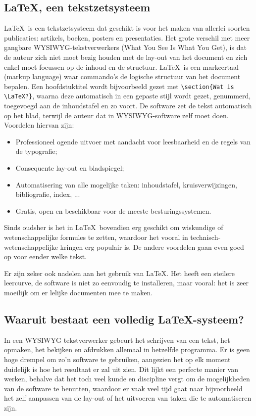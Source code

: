 \documentclass[kulak]{kulakarticle} %
\begin{document}
\subsection{\LaTeX, een tekstzetsysteem}
\LaTeX\ is een tekstzetsysteem dat geschikt is voor het maken van allerlei soorten publicaties: artikels, boeken, posters en presentaties. Het grote verschil met meer gangbare WYSIWYG-tekstverwerkers (What You See Is What You Get), is dat de auteur zich niet moet bezig houden met de lay-out van het document en zich enkel moet focussen op de inhoud en de structuur. \LaTeX\ is een markeertaal (markup language) waar commando's de logische structuur van het document bepalen. Een hoofdstuktitel wordt bijvoorbeeld gezet met \verb+\section{Wat is \LaTeX?}+, waarna deze automatisch in een gepaste stijl wordt gezet, genummerd, toegevoegd aan de inhoudstafel en zo voort. De software zet de tekst automatisch op het blad, terwijl de auteur dat in WYSIWYG-software zelf moet doen. Voordelen hiervan zijn:
\begin{itemize}
	\item Professioneel ogende uitvoer met aandacht voor leesbaarheid en de regels van de typografie;
	\item Consequente lay-out en bladspiegel;
	\item Automatisering van alle mogelijke taken: inhoudstafel, kruisverwijzingen, bibliografie, index, ...
	\item Gratis, open en beschikbaar voor de meeste besturingssystemen.
\end{itemize}
Sinds oudsher is het in \LaTeX\ bovendien erg geschikt om wiskundige of wetenschappelijke formules te zetten, waardoor het vooral in technisch-wetenschappelijke kringen erg populair is. De andere voordelen gaan even goed op voor eender welke tekst.

Er zijn zeker ook nadelen aan het gebruik van \LaTeX. Het heeft een steilere leercurve, de software is niet zo eenvoudig te installeren, maar vooral: het is zeer moeilijk om er lelijke documenten mee te maken.

\subsection{Waaruit bestaat een volledig \LaTeX-systeem?}
In een WYSIWYG tekstverwerker gebeurt het schrijven van een tekst, het opmaken, het bekijken en afdrukken allemaal in hetzelfde programma. Er is geen hoge drempel om zo'n software te gebruiken, aangezien het op elk moment duidelijk is hoe het resultaat er zal uit zien. Dit lijkt een perfecte manier van werken, behalve dat het toch veel kunde en discipline vergt om de mogelijkheden van de software te benutten, waardoor er vaak veel tijd gaat naar bijvoorbeeld het zelf aanpassen van de lay-out of het uitvoeren van taken die te automatiseren zijn.
\end{document}
